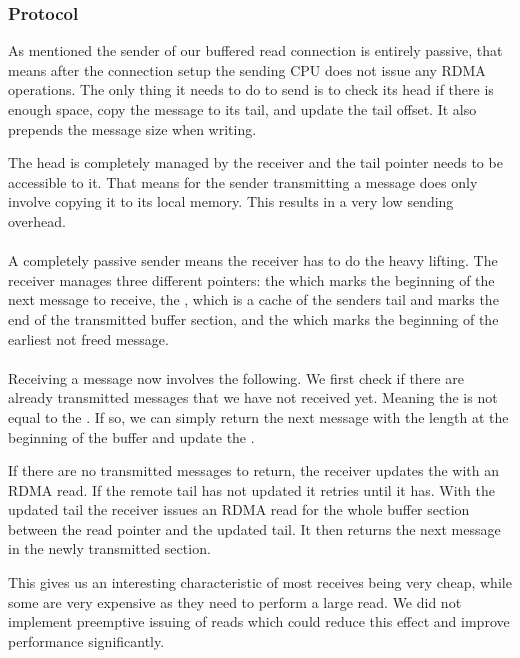 \subsubsection{Protocol}
As mentioned the sender of our buffered read connection is entirely passive, that means after the connection setup the sending
CPU does not issue any RDMA operations. The only thing it needs to do to send is to check its head if there is enough space,
copy the message to its tail, and update the tail offset.  It also prepends the message size when  writing. 

The head is completely managed by the receiver and the tail pointer needs to be accessible to it. That means for the sender 
transmitting a message does only involve copying it to its local memory. This results in
a very low sending overhead.

\paragraph{} A completely passive sender means the receiver has to do the heavy lifting. The receiver manages three different pointers: 
the  which marks the beginning of the next message to receive, the , which is a cache of
the senders tail and marks the end of the transmitted buffer section, and the  which marks the beginning of 
the earliest not freed message.

\paragraph{} Receiving a message now involves the following. We first check if there are already transmitted messages that 
we have not received yet. Meaning the  is not equal to the . If so, we can simply 
return the next message with the length at the beginning of the buffer and update the .

If there are no transmitted messages to return, the receiver updates the  with an RDMA read. If the remote
tail has not updated it retries until it has. With the updated tail the receiver issues an RDMA read for the whole buffer 
section between the read pointer and the updated tail. It then returns the next message in the newly transmitted section.

This gives us an interesting characteristic of most receives being very cheap, while some are very expensive as they need to 
perform a large read. We did not implement preemptive issuing of reads which could reduce this effect and improve performance
significantly.

